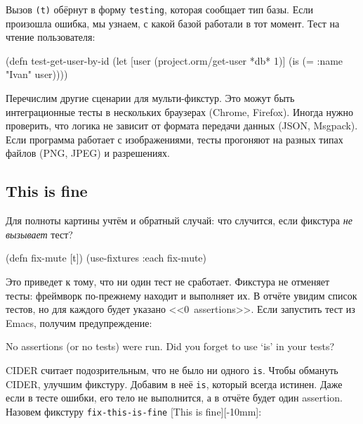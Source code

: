 Вызов \verb|(t)| обёрнут в форму \verb|testing|, которая сообщает тип
базы. Если произошла ошибка, мы узнаем, с какой базой работали в тот
момент. Тест на чтение пользователя:

\begin{english}
  \begin{clojure}
(defn test-get-user-by-id
  (let [user (project.orm/get-user *db* 1)]
    (is (= {:name "Ivan"} user))))
  \end{clojure}
\end{english}

Перечислим другие сценарии для мульти-фикстур. Это можут быть интеграционные
тесты в нескольких браузерах (Chrome, Firefox). Иногда нужно проверить, что
логика не зависит от формата передачи данных (JSON, Msgpack). Если программа
работает с изображениями, тесты прогоняют на разных типах файлов (PNG, JPEG) и
разрешениях.

\subsection{This is fine}

Для полноты картины учтём и обратный случай: что случится, если фикстура
\emph{не вызывает} тест?


\begin{english}
  \begin{clojure}
(defn fix-mute [t])
(use-fixtures :each fix-mute)
  \end{clojure}
\end{english}

Это приведет к тому, что ни один тест не сработает. Фикстура не отменяет тесты:
фреймворк по-прежнему находит и выполняет их. В отчёте увидим список тестов,
но для каждого будет указано <<0~assertions>>. Если запустить тест из Emacs,
получим предупреждение:

\begin{english}
  \begin{clojure}
No assertions (or no tests) were run.
Did you forget to use ‘is’ in your tests?
  \end{clojure}
\end{english}


CIDER считает подозрительным, что не было ни одного \verb|is|. Чтобы обмануть
CIDER, улучшим фикстуру. Добавим в неё \verb|is|, который всегда истинен. Даже
если в тесте ошибки, его тело не выполнится, а в отчёте будет один
assertion. Назовем фикстуру \verb|fix-this-is-fine|%
[This is fine][-10mm]:

